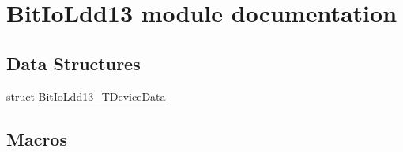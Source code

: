 \hypertarget{group___bit_io_ldd13__module}{}\section{Bit\+Io\+Ldd13 module documentation}
\label{group___bit_io_ldd13__module}
\subsection*{Data Structures}
\begin{DoxyCompactItemize}
\item 
struct \hyperlink{struct_bit_io_ldd13___t_device_data}{Bit\+Io\+Ldd13\+\_\+\+T\+Device\+Data}
\end{DoxyCompactItemize}
\subsection*{Macros}
